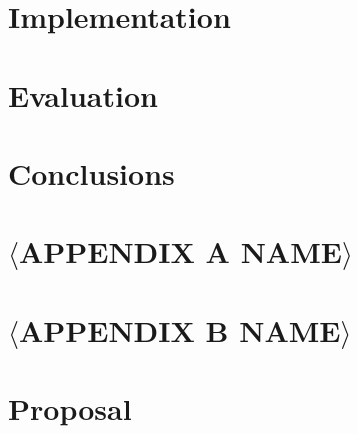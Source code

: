 \documentclass[12pt,a4paper,twoside,openright]{report}
\begin{document}
\chapter{Implementation}


\chapter{Evaluation}


\chapter{Conclusions}



\newpage

\printbibliography


\appendix


\chapter{\(\langle\)APPENDIX A NAME\(\rangle\)}



\newpage

\chapter{\(\langle\)APPENDIX B NAME\(\rangle\)}



\newpage

\chapter{Proposal}



\end{document}
